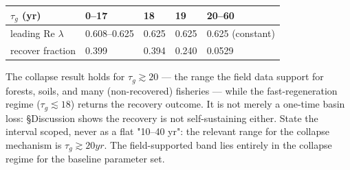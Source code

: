 \documentclass[11pt]{article}
\begin{document}
\begin{table}[htbp]
\centering
\small
\begin{tabularx}{\textwidth}{>{\raggedright\arraybackslash}Xllll}
\toprule
$\tau{}_{g}$ (yr) & 0–17 & 18 & 19 & 20–60 \\
\midrule
leading Re \ensuremath{\lambda{}} & 0.608–0.625 & 0.625 & 0.625 & 0.625 (constant) \\
recover fraction & 0.399 & 0.394 & 0.240 & 0.0529 \\
\bottomrule
\end{tabularx}
\end{table}

The collapse result holds for $\tau{}_{g} \gtrsim{} 20$ — the range the field data support for forests, soils, and many (non-recovered) fisheries — while the fast-regeneration regime ($\tau{}_{g} \lesssim{} 18$) returns the recovery outcome. It is not merely a one-time basin loss: §Discussion shows the recovery is not self-sustaining either. State the interval scoped, never as a flat "10–40 yr": the relevant range for the collapse mechanism is $\tau{}_{g} \gtrsim{} 20 yr$. The field-supported band lies entirely in the collapse regime for the baseline parameter set.
\end{document}
